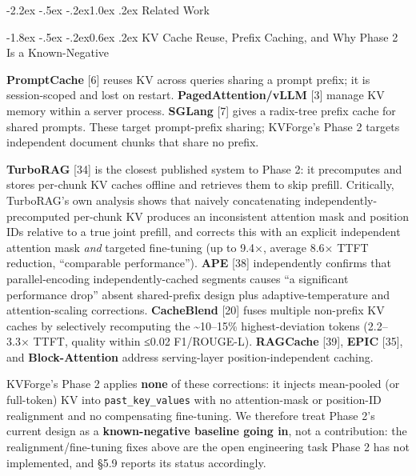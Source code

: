 \documentclass[10pt,twocolumn]{article}
\makeatletter
\renewcommand\section{\@startsection{section}{1}{\z@}%
  {-2.2ex \@plus -.5ex \@minus -.2ex}{1.0ex \@plus .2ex}%
  {\normalfont\large\bfseries}}
\renewcommand\subsection{\@startsection{subsection}{2}{\z@}%
  {-1.8ex \@plus -.5ex \@minus -.2ex}{0.6ex \@plus .2ex}%
  {\normalfont\normalsize\bfseries}}
\makeatother
\begin{document}
\hypertarget{related-work}{%
\section{Related Work}\label{related-work}}

\hypertarget{kv-cache-reuse-prefix-caching-and-why-phase-2-is-a-known-negative}{%
\subsection{KV Cache Reuse, Prefix Caching, and Why Phase 2 Is a Known-Negative}\label{kv-cache-reuse-prefix-caching-and-why-phase-2-is-a-known-negative}}

\textbf{PromptCache} {[}6{]} reuses KV across queries sharing a prompt prefix; it is session-scoped and lost on restart. \textbf{PagedAttention/vLLM} {[}3{]} manage KV memory within a server process. \textbf{SGLang} {[}7{]} gives a radix-tree prefix cache for shared prompts. These target prompt-prefix sharing; KVForge's Phase 2 targets independent document chunks that share no prefix.

\textbf{TurboRAG} {[}34{]} is the closest published system to Phase 2: it precomputes and stores per-chunk KV caches offline and retrieves them to skip prefill. Critically, TurboRAG's own analysis shows that naively concatenating independently-precomputed per-chunk KV produces an inconsistent attention mask and position IDs relative to a true joint prefill, and corrects this with an explicit independent attention mask \emph{and} targeted fine-tuning (up to 9.4×, average 8.6× TTFT reduction, ``comparable performance''). \textbf{APE} {[}38{]} independently confirms that parallel-encoding independently-cached segments causes ``a significant performance drop'' absent shared-prefix design plus adaptive-temperature and attention-scaling corrections. \textbf{CacheBlend} {[}20{]} fuses multiple non-prefix KV caches by selectively recomputing the \textasciitilde10--15\% highest-deviation tokens (2.2--3.3× TTFT, quality within ≤0.02 F1/ROUGE-L). \textbf{RAGCache} {[}39{]}, \textbf{EPIC} {[}35{]}, and \textbf{Block-Attention} address serving-layer position-independent caching.

KVForge's Phase 2 applies \textbf{none} of these corrections: it injects mean-pooled (or full-token) KV into \texttt{past\_key\_values} with no attention-mask or position-ID realignment and no compensating fine-tuning. We therefore treat Phase 2's current design as a \textbf{known-negative baseline going in}, not a contribution: the realignment/fine-tuning fixes above are the open engineering task Phase 2 has not implemented, and §5.9 reports its status accordingly.
\end{document}
